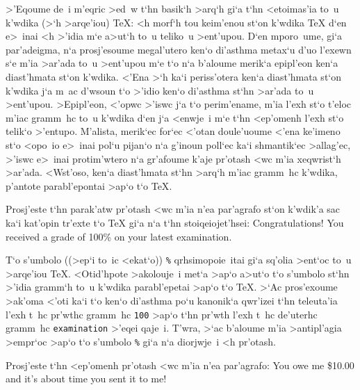 >'Eqoume de~i m'eqric >ed~w t`hn basik`h >arq`h gi`a t`hn <etoimas'ia   
to~u k'wdika (>`h >arqe'iou) {\rm\TeX}:  <h morf`h tou keim'enou st`on
k'wdika {\rm \TeX} d`en e>~inai <h >'idia m`e a>ut`h to~u teliko~u
>ent'upou. D`en mporo~ume, gi`a par'adeigma, n`a prosj'esoume
megal'utero ken`o di'asthma metax`u d'uo l'exewn s`e m'ia >ar'ada to~u
>ent'upou m`e t`o n`a b'aloume merik`a epipl'eon ken`a diast'hmata st`on
k'wdika. <'Ena >`h ka`i peris\-s'otera ken`a diast'hmata st`on k'wdika
j`a m~ac d'wsoun t`o >'idio ken`o di'asthma st`hn >ar'ada to~u >ent'upou.
>Epipl'eon, <'opwc >'iswc j`a t`o perim'ename, m'ia l'exh st`o t'eloc
m'iac gramm~hc to~u k'wdika d`en j`a <enwje~i m`e t`hn <ep'omenh l'exh
st`o telik`o >'entupo.  M'alista, meri\-k`ec for`ec <'otan doule'uoume
<'ena ke'imeno st`o <opo~io e>~inai pol`u pijan`o n`a g'inoun poll`ec
ka`i sh\-manti\-k`ec >allag'ec, >'iswc e>~inai protim'wtero n`a gr'afoume
k'aje pr'otash <wc m'ia xeqwrist`h >ar'ada.  <Wst'oso, ken`a
diast'hmata st`hn >arq`h m'iac gramm~hc k'wdika, p'antote parabl'epontai
>ap`o t`o {\rm\TeX}.

\exercise Prosj'este t`hn parak'atw pr'otash <wc m'ia n'ea par'agrafo  
st`on k'wdik'a sac ka`i kat'opin tr'exte t`o {\rm \TeX} gi`a n`a t`hn
stoiqeiojet'hsei:
\beginuser
Congratulations! You received a grade of 100\% on your latest
examination.
\enduser

\noindent
T`o s'umbolo ((>ep`i to~ic <ekat`o)) {\tt\%} qrhsimopoie~itai gi`a
sq'olia >ent`oc to~u >arqe'iou {\rm\TeX}\null.  <Oti\-d'h\-pote
>akolouje~i met`a >ap`o a>ut`o t`o s'umbolo st`hn >'idia gramm`h to~u
k'wdika parabl'epetai >ap`o t`o {\rm \TeX}\null. >`Ac pros'exoume
>ak'oma <'oti ka`i t`o ken`o di'asthma po`u kanonik`a qwr'izei t`hn
teleuta'ia l'exh t~hc pr'wthc gramm~hc {\tt 100} >ap`o t`hn pr'wth
l'exh t~hc de'uterhc gramm~hc {\tt examination} >'eqei qaje~i.  T'wra,
>`ac b'aloume m'ia >antipl'agia >empr`oc >ap`o t`o s'umbolo {\tt\%} gi`a
n`a diorjwje~i <h pr'otash.
\toindex{\%}

\exercise Prosj'este t`hn <ep'omenh pr'otash <wc m'ia n'ea par'agrafo:
\beginuser
You owe me \$10.00 and it's about time you sent it to me!
\enduser

